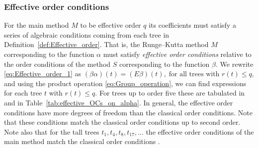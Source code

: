 \subsubsection{Effective order conditions}\label{sec:effOrderCond}

For the main method $M$ to be effective order $q$ its coefficients must satisfy a series of algebraic conditions coming from each tree in Definition~\ref{def:Effective_order}.
That is, the Runge--Kutta method $M$ corresponding to the function $\alpha$ must satisfy
\emph{effective order conditions} relative to the order conditions of the
method $S$ corresponding to the function $\beta$.
We rewrite \eqref{eq:Effective_order_1} as
$(\beta\alpha)(t) = (E\beta)(t), \; \text{for all trees with $r(t) \leq q$,}$
and using the product operation \eqref{eq:Group_operation}, we can find expressions for each tree $t$ with $r(t) \leq q$.
For trees up to order five these are tabulated in \cite[Sec~389]{Butcher2008_book}
and in Table~\ref{tab:effective_OCs_on_alpha}.
In general, the effective order conditions have more degrees of
freedom than the classical order conditions.
Note that these conditions match the classical order conditions up to
second order.
Note also that for the tall trees $t_1, t_4, t_8, t_{17}, \dots$ the
effective order conditions of the main method match the classical
order conditions \cite{Butcher2008_book}.
